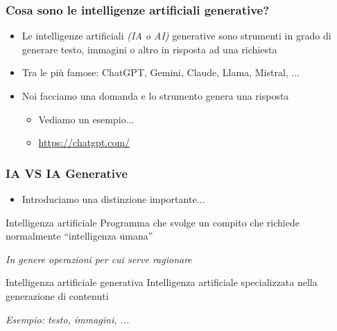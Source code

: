 
\begin{contentframe}
    \frametitle{Cosa sono le intelligenze artificiali generative?}

    \begin{itemize}
        \item Le intelligenze artificiali \textit{(IA o AI)} generative sono strumenti in grado di generare testo, immagini o altro in risposta ad una richiesta

        \bigskip
        \item Tra le più famose: ChatGPT, Gemini, Claude, Llama, Mistral, ...

        \bigskip
        \item Noi facciamo una domanda e lo strumento genera una risposta
        \begin{itemize}
            \item Vediamo un esempio...
            \item \url{https://chatgpt.com/}
        \end{itemize}
    \end{itemize}
\end{contentframe}


\begin{contentframe}
    \frametitle{IA VS IA Generative}

    \begin{itemize}
        \item Introduciamo una distinzione importante...
    \end{itemize}

    \bigskip
    \begin{block}{Intelligenza artificiale}
        Programma che svolge un compito che richiede normalmente ``intelligenza umana''

        \small\textit{In genere operazioni per cui serve ragionare}
    \end{block}

    \begin{block}{Intelligenza artificiale generativa}
        Intelligenza artificiale specializzata nella generazione di contenuti
        
        \small\textit{Esempio: testo, immagini, ...}
    \end{block}
\end{contentframe}


